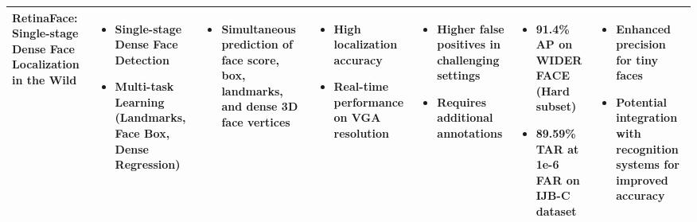 \documentclass{article}
\begin{document}
\begin{adjustbox}{width=\textwidth}
\begin{tabular}{|p{}|p{}|p{}|p{}|p{}|p{}|p{}|}
    \hline
    RetinaFace: Single-stage Dense Face Localization in the Wild & 
    \begin{itemize}[leftmargin=*]
        \item Single-stage Dense Face Detection
        \item Multi-task Learning (Landmarks, Face Box, Dense Regression)
    \end{itemize} & 
    \begin{itemize}[leftmargin=*]
        \item Simultaneous prediction of face score, box, landmarks, and dense 3D face vertices
    \end{itemize} & 
    \begin{itemize}[leftmargin=*]
        \item High localization accuracy
        \item Real-time performance on VGA resolution
    \end{itemize} & 
    \begin{itemize}[leftmargin=*]
        \item Higher false positives in challenging settings
        \item Requires additional annotations
    \end{itemize} & 
    \begin{itemize}[leftmargin=*]
        \item 91.4\% AP on WIDER FACE (Hard subset)
        \item 89.59\% TAR at 1e-6 FAR on IJB-C dataset
    \end{itemize} & 
    \begin{itemize}[leftmargin=*]
        \item Enhanced precision for tiny faces
        \item Potential integration with recognition systems for improved accuracy
    \end{itemize} \\
    \hline


\end{tabular}
\end{adjustbox}



\newpage
\end{document}
